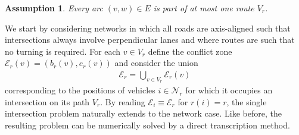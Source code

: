 \documentclass[a4paper]{article}
\theoremstyle{definition}
\theoremstyle{plain}
\newtheorem{assump}{Assumption}[section]
\begin{document}
\begin{assump}\label{assump:disjoint_routes}
  Every arc $(v,w) \in E$ is part of at most one route $V_{r}$.
\end{assump}

We start by considering networks in which all roads are axis-aligned such that
intersections always involve perpendicular lanes and where routes are such that
no turning is required. For each $v \in V_{r}$ define the conflict zone
$\mathcal{E}_{r}(v) = (b_{r}(v), e_{r}(v))$ and consider the union
\begin{align*}
  \mathcal{E}_{r} = \bigcup_{v \in V_{r}} \mathcal{E}_{r}(v)
\end{align*}
corresponding to the positions of vehicles $i \in \mathcal{N}_{r}$ for which it
occupies an intersection on its path $V_{r}$.
%
By reading $\mathcal{E}_{i} \equiv \mathcal{E}_{r}$ for $r(i) = r$, the single
intersection problem naturally extends to the network case. Like before, the
resulting problem can be numerically solved by a direct transcription method.
\end{document}
